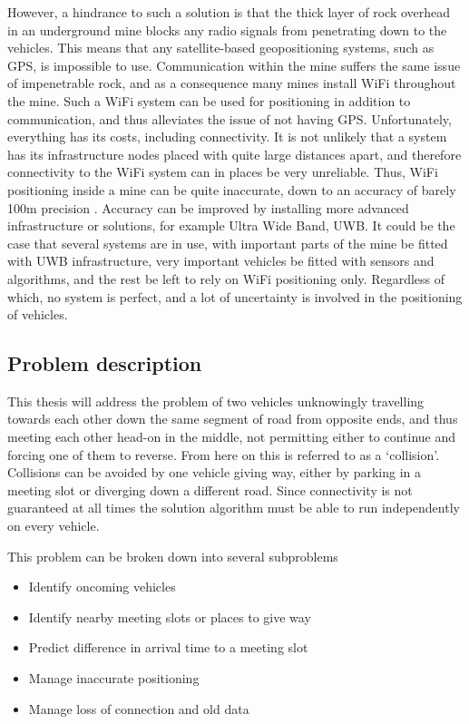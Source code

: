 \documentclass{article}
\begin{document}
		However, a hindrance to such a solution is that the thick layer of rock overhead in an underground mine blocks any radio signals from penetrating down to the vehicles. This means that any satellite-based geopositioning systems, such as GPS, is impossible to use. Communication within the mine suffers the same issue of impenetrable rock, and as a consequence many mines install WiFi throughout the mine. Such a WiFi system can be used for positioning in addition to communication, and thus alleviates the issue of not having GPS. Unfortunately, everything has its costs, including connectivity. It is not unlikely that a system has its infrastructure nodes placed with quite large distances apart, and therefore connectivity  to the WiFi system can in places be very unreliable. Thus, WiFi positioning inside a mine can be quite inaccurate, down to an accuracy of barely 100m precision \cite{Gronlund}. Accuracy can be improved by installing more advanced infrastructure or solutions, for example Ultra Wide Band, UWB. It could be the case that several systems are in use, with important parts of the mine be fitted with UWB infrastructure, very important vehicles be fitted with sensors and algorithms, and the rest be left to rely on WiFi positioning only. Regardless of which, no system is perfect, and a lot of uncertainty is involved in the positioning of vehicles.

		\subsection{Problem description}
			This thesis will address the problem of two vehicles unknowingly travelling towards each other down the same segment of road from opposite ends, and thus meeting each other head-on in the middle, not permitting either to continue and forcing one of them to reverse. From here on this is referred to as a `collision'. Collisions can be avoided by one vehicle giving way, either by parking in a meeting slot or diverging down a different road. Since connectivity is not guaranteed at all times the solution algorithm must be able to run independently on every vehicle.

			This problem can be broken down into several subproblems
			\begin{itemize}
				\item Identify oncoming vehicles
				\item Identify nearby meeting slots or places to give way
				\item Predict difference in arrival time to a meeting slot
				\item Manage inaccurate positioning
				\item Manage loss of connection and old data
			\end{itemize}
\end{document}
